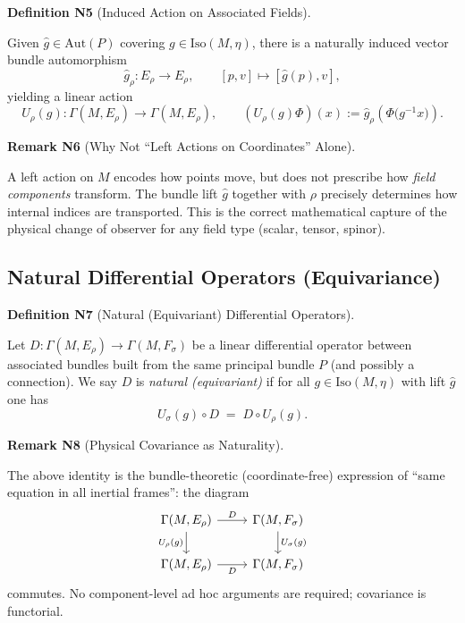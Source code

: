 \documentclass[10pt, letterpaper]{article}
\newcommand{\Aut}{\mathrm{Aut}}
\newcommand{\CustomHeading}[3]{%
  \par\medskip\noindent%
  \textbf{#1 #2} \textnormal{(#3)}.\enskip%
}
\newenvironment{DEF}[2]{\begin{unitbox}\CustomHeading{Definition}{#1}{#2}}{\end{unitbox}}
\newenvironment{REM}[2]{\begin{unitbox}\CustomHeading{Remark}{#1}{#2}}{\end{unitbox}}
\begin{document}
\begin{DEF}{N5}{Induced Action on Associated Fields}
Given $\widehat g\in\Aut(P)$ covering $g\in\mathrm{Iso}(M,\eta)$, there is a naturally induced vector bundle automorphism
\[
\widehat g_\rho: E_\rho \to E_\rho,\qquad [p,v] \mapsto [\widehat g(p),v],
\]
yielding a linear action
\[
U_\rho(g):\Gamma(M,E_\rho)\to\Gamma(M,E_\rho),\qquad (U_\rho(g)\Phi)(x):=
\widehat g_\rho\!\left(\Phi\big(g^{-1}x\big)\right).
\]
\end{DEF}

\begin{REM}{N6}{Why Not ``Left Actions on Coordinates'' Alone}
A left action on $M$ encodes how points move, but does not prescribe how \emph{field components} transform.  
The bundle lift $\widehat g$ together with $\rho$ precisely determines how internal indices are transported.  
This is the correct mathematical capture of the physical change of observer for any field type (scalar, tensor, spinor).
\end{REM}

\subsection{Natural Differential Operators (Equivariance)}

\begin{DEF}{N7}{Natural (Equivariant) Differential Operators}
Let $D:\Gamma(M,E_\rho)\to\Gamma(M,F_\sigma)$ be a linear differential operator between associated bundles built from the same principal bundle $P$ (and possibly a connection).  
We say $D$ is \emph{natural (equivariant)} if for all $g\in\mathrm{Iso}(M,\eta)$ with lift $\widehat g$ one has
\[
U_\sigma(g)\circ D \;=\; D\circ U_\rho(g).
\]
\end{DEF}

\begin{REM}{N8}{Physical Covariance as Naturality}
The above identity is the bundle-theoretic (coordinate-free) expression of ``same equation in all inertial frames'': the diagram
\[
\begin{tikzcd}
\Gamma(M,E_\rho) \arrow[r,"D"] \arrow[d,"U_\rho(g)"']
& \Gamma(M,F_\sigma) \arrow[d,"U_\sigma(g)"]\\
\Gamma(M,E_\rho) \arrow[r,"D"']
& \Gamma(M,F_\sigma)
\end{tikzcd}
\]
commutes.  
No component-level ad hoc arguments are required; covariance is functorial.
\end{REM}
\end{document}
